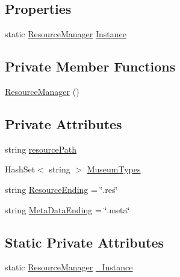 \subsection*{Properties}
\begin{DoxyCompactItemize}
\item 
static \mbox{\hyperlink{class_resource_manager}{Resource\+Manager}} \mbox{\hyperlink{class_resource_manager_a5980d46bdd1e2e1b4961ef63cc82d0cb}{Instance}}
\end{DoxyCompactItemize}
\subsection*{Private Member Functions}
\begin{DoxyCompactItemize}
\item 
\mbox{\hyperlink{class_resource_manager_a735c18a05da5cee46ddd367f2ea2cbaa}{Resource\+Manager}} ()
\end{DoxyCompactItemize}
\subsection*{Private Attributes}
\begin{DoxyCompactItemize}
\item 
string \mbox{\hyperlink{class_resource_manager_a96bd19ebc1522ce7902e65246890b302}{resource\+Path}}
\item 
Hash\+Set$<$ string $>$ \mbox{\hyperlink{class_resource_manager_a85a0c1cff1b6a05750826a2f0efcbd6d}{Museum\+Types}}
\item 
string \mbox{\hyperlink{class_resource_manager_a01dc42a70cb973472fd9c2df8330f35a}{Resource\+Ending}} = \char`\"{}.res\char`\"{}
\item 
string \mbox{\hyperlink{class_resource_manager_a9577139e032703d0f36ef980dcd303ad}{Meta\+Data\+Ending}} = \char`\"{}.meta\char`\"{}
\end{DoxyCompactItemize}
\subsection*{Static Private Attributes}
\begin{DoxyCompactItemize}
\item 
static \mbox{\hyperlink{class_resource_manager}{Resource\+Manager}} \mbox{\hyperlink{class_resource_manager_ad2220b6e0d46489a5ad32c6faf624b2e}{\+\_\+\+Instance}}
\end{DoxyCompactItemize}


